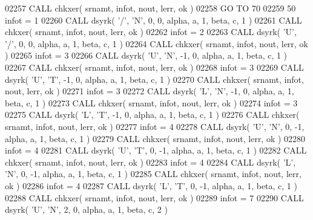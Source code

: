 \begin{DoxyCode}
02257       \textcolor{keyword}{CALL }chkxer( srnamt, infot, nout, lerr, ok )
02258       \textcolor{keywordflow}{GO TO} 70
02259    50 infot = 1
02260       \textcolor{keyword}{CALL }dsyrk( \textcolor{stringliteral}{'/'}, \textcolor{stringliteral}{'N'}, 0, 0, alpha, a, 1, beta, c, 1 )
02261       \textcolor{keyword}{CALL }chkxer( srnamt, infot, nout, lerr, ok )
02262       infot = 2
02263       \textcolor{keyword}{CALL }dsyrk( \textcolor{stringliteral}{'U'}, \textcolor{stringliteral}{'/'}, 0, 0, alpha, a, 1, beta, c, 1 )
02264       \textcolor{keyword}{CALL }chkxer( srnamt, infot, nout, lerr, ok )
02265       infot = 3
02266       \textcolor{keyword}{CALL }dsyrk( \textcolor{stringliteral}{'U'}, \textcolor{stringliteral}{'N'}, -1, 0, alpha, a, 1, beta, c, 1 )
02267       \textcolor{keyword}{CALL }chkxer( srnamt, infot, nout, lerr, ok )
02268       infot = 3
02269       \textcolor{keyword}{CALL }dsyrk( \textcolor{stringliteral}{'U'}, \textcolor{stringliteral}{'T'}, -1, 0, alpha, a, 1, beta, c, 1 )
02270       \textcolor{keyword}{CALL }chkxer( srnamt, infot, nout, lerr, ok )
02271       infot = 3
02272       \textcolor{keyword}{CALL }dsyrk( \textcolor{stringliteral}{'L'}, \textcolor{stringliteral}{'N'}, -1, 0, alpha, a, 1, beta, c, 1 )
02273       \textcolor{keyword}{CALL }chkxer( srnamt, infot, nout, lerr, ok )
02274       infot = 3
02275       \textcolor{keyword}{CALL }dsyrk( \textcolor{stringliteral}{'L'}, \textcolor{stringliteral}{'T'}, -1, 0, alpha, a, 1, beta, c, 1 )
02276       \textcolor{keyword}{CALL }chkxer( srnamt, infot, nout, lerr, ok )
02277       infot = 4
02278       \textcolor{keyword}{CALL }dsyrk( \textcolor{stringliteral}{'U'}, \textcolor{stringliteral}{'N'}, 0, -1, alpha, a, 1, beta, c, 1 )
02279       \textcolor{keyword}{CALL }chkxer( srnamt, infot, nout, lerr, ok )
02280       infot = 4
02281       \textcolor{keyword}{CALL }dsyrk( \textcolor{stringliteral}{'U'}, \textcolor{stringliteral}{'T'}, 0, -1, alpha, a, 1, beta, c, 1 )
02282       \textcolor{keyword}{CALL }chkxer( srnamt, infot, nout, lerr, ok )
02283       infot = 4
02284       \textcolor{keyword}{CALL }dsyrk( \textcolor{stringliteral}{'L'}, \textcolor{stringliteral}{'N'}, 0, -1, alpha, a, 1, beta, c, 1 )
02285       \textcolor{keyword}{CALL }chkxer( srnamt, infot, nout, lerr, ok )
02286       infot = 4
02287       \textcolor{keyword}{CALL }dsyrk( \textcolor{stringliteral}{'L'}, \textcolor{stringliteral}{'T'}, 0, -1, alpha, a, 1, beta, c, 1 )
02288       \textcolor{keyword}{CALL }chkxer( srnamt, infot, nout, lerr, ok )
02289       infot = 7
02290       \textcolor{keyword}{CALL }dsyrk( \textcolor{stringliteral}{'U'}, \textcolor{stringliteral}{'N'}, 2, 0, alpha, a, 1, beta, c, 2 )

\end{DoxyCode}
